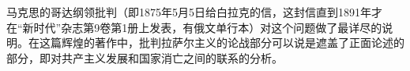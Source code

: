 
\mbox{}

\mbox{}

马克思的哥达纲领批判（即1875年5月5日给白拉克的信，这封信直到1891年才在“新时代”杂志第9卷第1册上发表，有俄文单行本）对这个问题做了最详尽的说明。在这篇辉煌的著作中，批判拉萨尔主义的论战部分可以说是遮盖了正面论述的部分，即对共产主义发展和国家消亡之间的联系的分析。


